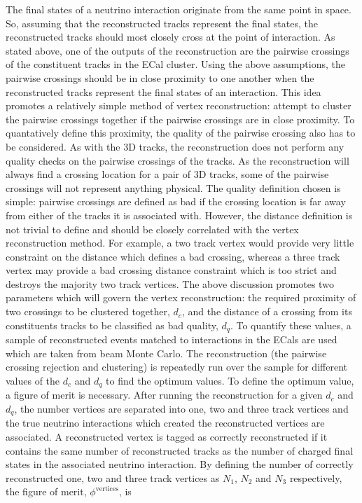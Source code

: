 \newline
\newline
The final states of a neutrino interaction originate from the same point in space.  So, assuming that the reconstructed tracks represent the final states, the reconstructed tracks should most closely cross at the point of interaction.  As stated above, one of the outputs of the reconstruction are the pairwise crossings of the constituent tracks in the ECal cluster.  Using the above assumptions,  the pairwise crossings should be in close proximity to one another when the reconstructed tracks represent the final states of an interaction.  This idea promotes a relatively simple method of vertex reconstruction: attempt to cluster the pairwise crossings together if the pairwise crossings are in close proximity.  To quantatively define this proximity, the quality of the pairwise crossing also has to be considered.
\newline 
\newline
As with the 3D tracks, the reconstruction does not perform any quality checks on the pairwise crossings of the tracks.  As the reconstruction will always find a crossing location for a pair of 3D tracks, some of the pairwise crossings will not represent anything physical.  The quality definition chosen is simple: pairwise crossings are defined as bad if the crossing location is far away from either of the tracks it is associated with.  However, the distance definition is not trivial to define and should be closely correlated with the vertex reconstruction method.  For example, a two track vertex would provide very little constraint on the distance which defines a bad crossing, whereas a three track vertex may provide a bad crossing distance constraint which is too strict and destroys the majority two track vertices. 
\newline
\newline
The above discussion promotes two parameters which will govern the vertex reconstruction: the required proximity of two crossings to be clustered together, $d_c$, and the distance of a crossing from its constituents tracks to be classified as bad quality, $d_q$.  To quantify these values, a sample of reconstructed events matched to interactions in the ECals are used which are taken from beam Monte Carlo.  The reconstruction (the pairwise crossing rejection and clustering) is repeatedly run over the sample for different values of the $d_c$ and $d_q$ to find the optimum values.  To define the optimum value, a figure of merit is necessary.  After running the reconstruction for a given $d_c$ and $d_q$, the number vertices are separated into one, two and three track vertices and the true neutrino interactions which created the reconstructed vertices are associated.  A reconstructed vertex is tagged as correctly reconstructed if it contains the same number of reconstructed tracks as the number of charged final states in the associated neutrino interaction.  By defining the number of correctly reconstructed one, two and three track vertices as $N_1$, $N_2$ and $N_3$ respectively, the figure of merit, $\phi^{\textrm{vertices}}$, is
